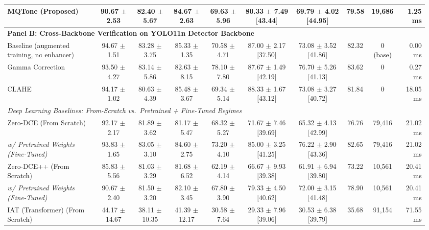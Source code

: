 \documentclass[final,5p,times,twocolumn,authoryear]{elsarticle}
\begin{document}
\begin{table}[t]
{\begin{tabular}{lccccccccr}
\midrule
\textbf{MQTone (Proposed)} & \textbf{90.67 $\pm$ 2.53} & \textbf{82.40 $\pm$ 5.67} & \textbf{84.67 $\pm$ 2.63} & \textbf{69.63 $\pm$ 5.96} & \textbf{80.33 $\pm$ 7.49 \scriptsize{[43.44]}} & \textbf{69.79 $\pm$ 4.02 \scriptsize{[44.95]}} & \textbf{79.58} & \textbf{19,686} & \textbf{1.25 ms} \\
\midrule
\multicolumn{10}{l}{\textbf{Panel B: Cross-Backbone Verification on YOLO11n Detector Backbone}} \\
\midrule
Baseline (augmented training, no enhancer) & 94.67 $\pm$ 1.51 & 83.28 $\pm$ 3.75 & 85.33 $\pm$ 1.35 & 70.58 $\pm$ 4.71 & 87.00 $\pm$ 2.17 \scriptsize{[37.50]} & 73.08 $\pm$ 3.52 \scriptsize{[41.86]} & 82.32 & 0 (base) & 0.00 ms \\
Gamma Correction \cite{Poynton1993} & 93.50 $\pm$ 4.27 & 83.14 $\pm$ 5.86 & 82.63 $\pm$ 8.15 & 78.10 $\pm$ 7.80 & 87.67 $\pm$ 1.49 \scriptsize{[42.19]} & 76.70 $\pm$ 5.26 \scriptsize{[41.13]} & 83.62 & 0 & 0.27 ms \\
CLAHE \cite{Zuiderveld1994} & 94.17 $\pm$ 1.02 & 80.63 $\pm$ 4.39 & 85.48 $\pm$ 3.67 & 69.34 $\pm$ 5.14 & 88.33 $\pm$ 1.67 \scriptsize{[43.12]} & 73.08 $\pm$ 3.27 \scriptsize{[40.72]} & 81.84 & 0 & 18.05 ms \\
\midrule
\multicolumn{10}{l}{\textit{Deep Learning Baselines: From-Scratch vs.\ Pretrained + Fine-Tuned Regimes}} \\
Zero-DCE (From Scratch) \cite{Guo2020} & 92.17 $\pm$ 2.17 & 81.89 $\pm$ 3.62 & 81.17 $\pm$ 5.47 & 68.32 $\pm$ 5.27 & 71.67 $\pm$ 7.46 \scriptsize{[39.69]} & 65.32 $\pm$ 4.13 \scriptsize{[42.99]} & 76.76 & 79,416 & 21.02 ms \\
\quad \textit{w/ Pretrained Weights (Fine-Tuned)} & 93.83 $\pm$ 1.65 & 83.05 $\pm$ 3.10 & 84.60 $\pm$ 2.75 & 73.20 $\pm$ 4.10 & 85.00 $\pm$ 3.25 \scriptsize{[41.25]} & 76.22 $\pm$ 2.90 \scriptsize{[43.36]} & 82.65 & 79,416 & 21.02 ms \\
Zero-DCE++ (From Scratch) \cite{Li2021} & 85.83 $\pm$ 5.56 & 81.03 $\pm$ 3.29 & 81.68 $\pm$ 6.52 & 62.19 $\pm$ 4.14 & 66.67 $\pm$ 9.93 \scriptsize{[39.38]} & 61.91 $\pm$ 6.94 \scriptsize{[39.80]} & 73.22 & 10,561 & 20.41 ms \\
\quad \textit{w/ Pretrained Weights (Fine-Tuned)} & 90.67 $\pm$ 2.40 & 81.50 $\pm$ 3.20 & 82.10 $\pm$ 3.45 & 67.80 $\pm$ 3.90 & 79.33 $\pm$ 4.50 \scriptsize{[40.62]} & 72.00 $\pm$ 3.15 \scriptsize{[41.48]} & 78.90 & 10,561 & 20.41 ms \\
IAT (Transformer) (From Scratch) \cite{Cui2022} & 44.17 $\pm$ 14.67 & 38.11 $\pm$ 10.35 & 41.39 $\pm$ 12.17 & 30.58 $\pm$ 7.64 & 29.33 $\pm$ 7.96 \scriptsize{[39.06]} & 30.53 $\pm$ 6.38 \scriptsize{[39.79]} & 35.68 & 91,154 & 71.55 ms \\

\end{tabular}}
\end{table}
\end{document}
